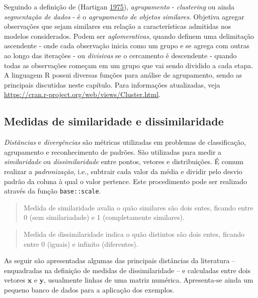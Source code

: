 \documentclass[
]{book}
\theoremstyle{definition}
\theoremstyle{definition}
\theoremstyle{definition}
\theoremstyle{remark}
\begin{document}
Seguindo a definição de (Hartigan \protect\hyperlink{ref-hartigan1975clustering}{1975}), \emph{agrupamento} - \emph{clustering} ou ainda \emph{segmentação de dados} - é o \emph{agrupamento de objetos similares}. Objetiva agregar observações que sejam similares em relação a características admitidas nos modelos considerados. Podem ser \emph{aglomerativas}, quando definem uma delimitação ascendente - onde cada observação inicia como um grupo e se agrega com outras ao longo das iterações - ou \emph{divisivas} se o cercamento é descendente - quando todas as observações começam em um grupo que vai sendo dividido a cada etapa.\\
A linguagem R possui diversas funções para análise de agrupamento, sendo as principais discutidas neste capítulo. Para informações atualizadas, veja \url{https://cran.r-project.org/web/views/Cluster.html}.

\hypertarget{medidas-de-similaridade-e-dissimilaridade}{%
\subsection{Medidas de similaridade e dissimilaridade}\label{medidas-de-similaridade-e-dissimilaridade}}

\emph{Distâncias} e \emph{divergências} são métricas utilizadas em problemas de classificação, agrupamento e reconhecimento de padrões. São utilizadas para medir a \emph{similaridade} ou \emph{dissimilaridade} entre pontos, vetores e distribuições. É comum realizar a \emph{padronização}, i.e., subtrair cada valor da média e dividir pelo desvio padrão da coluna à qual o valor pertence. Este procedimento pode ser realizado através da função \texttt{base::scale}.

\begin{quote}
Medida de similaridade avalia o quão similares são dois entes, ficando entre 0 (sem similariadade) e 1 (completamente similares).
\end{quote}

\begin{quote}
Medida de dissimilaridade indica o quão distintos são dois entes, ficando entre 0 (iguais) e infinito (diferentes).
\end{quote}

As seguir são apresentadas algumas das principais distâncias da literatura -- enquadradas na definição de medidas de dissimilaridade -- e calculadas entre dois vetores \(\boldsymbol{x}\) e \(\boldsymbol{y}\), usualmente linhas de uma matriz numérica. Apresenta-se ainda um pequeno banco de dados para a aplicação dos exemplos.
\end{document}
